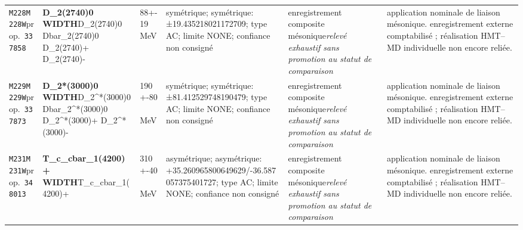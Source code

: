 \begin{landscape}
\begin{longtable}{L{1.85cm}L{4.45cm}L{2.35cm}L{4.05cm}L{3.35cm}L{7.15cm}}
\texttt{M228}\newline \texttt{M228W}\newline prop.\ \texttt{337858} & \textbf{D\_\allowbreak{}2(2740)0 WIDTH}\newline D\_\allowbreak{}2(2740)0 \textbar{}\allowbreak{} Dbar\_\allowbreak{}2(2740)0 \textbar{}\allowbreak{} D\_\allowbreak{}2(2740)+ \textbar{}\allowbreak{} D\_\allowbreak{}2(2740)- & 88+-19\,MeV & symétrique; symétrique: ±19.435218021172709; type AC; limite NONE; confiance non consigné & enregistrement composite mésonique\newline \emph{relevé exhaustif sans promotion au statut de comparaison} & application nominale de liaison mésonique. enregistrement externe comptabilisé ; réalisation HMT--MD individuelle non encore reliée. \\
\texttt{M229}\newline \texttt{M229W}\newline prop.\ \texttt{337873} & \textbf{D\_\allowbreak{}2*(3000)0 WIDTH}\newline D\_\allowbreak{}2\textasciicircum{}*(3000)0 \textbar{}\allowbreak{} Dbar\_\allowbreak{}2\textasciicircum{}*(3000)0 \textbar{}\allowbreak{} D\_\allowbreak{}2\textasciicircum{}*(3000)+ \textbar{}\allowbreak{} D\_\allowbreak{}2\textasciicircum{}*(3000)- & 190+-80\,MeV & symétrique; symétrique: ±81.412529748190479; type AC; limite NONE; confiance non consigné & enregistrement composite mésonique\newline \emph{relevé exhaustif sans promotion au statut de comparaison} & application nominale de liaison mésonique. enregistrement externe comptabilisé ; réalisation HMT--MD individuelle non encore reliée. \\
\texttt{M231}\newline \texttt{M231W}\newline prop.\ \texttt{348013} & \textbf{T\_\allowbreak{}c\_\allowbreak{}cbar\_\allowbreak{}1(4200)+ WIDTH}\newline T\_\allowbreak{}c\_\allowbreak{}cbar\_\allowbreak{}1(4200)+ & 310+-40\,MeV & asymétrique; asymétrique: +35.260965800649629/-36.587057375401727; type AC; limite NONE; confiance non consigné & enregistrement composite mésonique\newline \emph{relevé exhaustif sans promotion au statut de comparaison} & application nominale de liaison mésonique. enregistrement externe comptabilisé ; réalisation HMT--MD individuelle non encore reliée. \\

\end{longtable}
\end{landscape}
